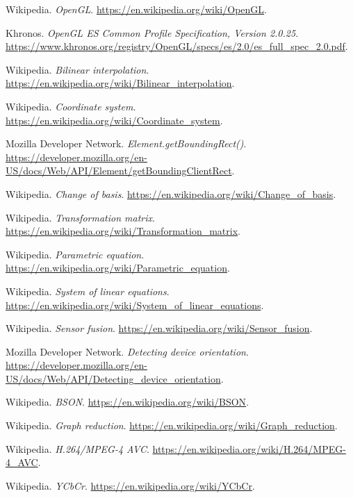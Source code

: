 \begin{thebibliography}{9}
Wikipedia. \textit{OpenGL}. \url{https://en.wikipedia.org/wiki/OpenGL}.

Khronos. \textit{OpenGL ES Common Profile Specification, Version 2.0.25}. \url{https://www.khronos.org/registry/OpenGL/specs/es/2.0/es_full_spec_2.0.pdf}.

Wikipedia. \textit{Bilinear interpolation}. \url{https://en.wikipedia.org/wiki/Bilinear_interpolation}.

Wikipedia. \textit{Coordinate system}. \url{https://en.wikipedia.org/wiki/Coordinate_system}.

Mozilla Developer Network. \textit{Element.getBoundingRect()}. \url{https://developer.mozilla.org/en-US/docs/Web/API/Element/getBoundingClientRect}.

Wikipedia. \textit{Change of basis}. \url{https://en.wikipedia.org/wiki/Change_of_basis}.

Wikipedia. \textit{Transformation matrix}. \url{https://en.wikipedia.org/wiki/Transformation_matrix}.

Wikipedia. \textit{Parametric equation}. \url{https://en.wikipedia.org/wiki/Parametric_equation}.

Wikipedia. \textit{System of linear equations}. \url{https://en.wikipedia.org/wiki/System_of_linear_equations}.

Wikipedia. \textit{Sensor fusion}. \url{https://en.wikipedia.org/wiki/Sensor_fusion}.

Mozilla Developer Network. \textit{Detecting device orientation}. \url{https://developer.mozilla.org/en-US/docs/Web/API/Detecting_device_orientation}.

Wikipedia. \textit{BSON}. \url{https://en.wikipedia.org/wiki/BSON}.

Wikipedia. \textit{Graph reduction}. \url{https://en.wikipedia.org/wiki/Graph_reduction}.

Wikipedia. \textit{H.264/MPEG-4 AVC}. \url{https://en.wikipedia.org/wiki/H.264/MPEG-4_AVC}.

Wikipedia. \textit{YCbCr}. \url{https://en.wikipedia.org/wiki/YCbCr}.

\end{thebibliography}

